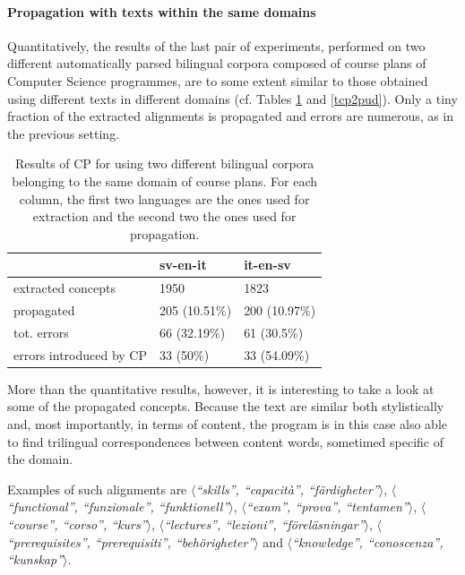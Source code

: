 \paragraph{Propagation with texts within the same domains}

Quantitatively, the results of the last pair of experiments, performed on two different automatically parsed bilingual corpora composed of course plans of Computer Science programmes, are to some extent similar to those obtained using different texts in different domains (cf. Tables \ref{tcp2courses} and \ref{tcp2pud}). Only a tiny fraction of the extracted alignments is propagated and errors are numerous, as in the previous setting. 

\begin{table}[H]
    \centering
    \begin{tabular}{|l|l|l|}
    \hline
                           & \textbf{sv-en-it} & \textbf{it-en-sv} \\ \hline
    extracted concepts     & 1950              & 1823              \\ \hline
    propagated             & 205 (10.51\%)     & 200 (10.97\%)     \\ \hline
    tot. errors            & 66 (32.19\%)      & 61 (30.5\%)       \\ \hline
    errors introduced by CP & 33 (50\%)        & 33 (54.09\%)      \\ \hline
    \end{tabular}
    \caption[Performance of CP Scenario 2 on automatically parsed homogeneous data]{Results of CP for using two different bilingual corpora belonging to the same domain of course plans. For each column, the first two languages are the ones used for extraction and the second two the ones used for propagation.}
    \label{tcp2courses}
    \end{table}

    More than the quantitative results, however, it is interesting to take a look at some of the propagated concepts. Because the text are similar both stylistically and, most importantly, in terms of content, the program is in this case also able to find trilingual correspondences between content words, sometimed specific of the domain. 
    
    Examples of such alignments are $\langle$\textit{``skills'', ``capacità'', ``färdigheter''}$\rangle$, $\langle$\textit{``functional'', ``funzionale'', ``funktionell''}$\rangle$, $\langle$\textit{``exam'', ``prova'', ``tentamen''}$\rangle$, $\langle$\textit{``course'', ``corso'', ``kurs''}$\rangle$, $\langle$\textit{``lectures'', ``lezioni'', ``föreläsningar''}$\rangle$, $\langle$\textit{``prerequisites'', ``prerequisiti'', ``behörigheter''}$\rangle$ and $\langle$\textit{``knowledge'', ``conoscenza'', ``kunskap''}$\rangle$. \smallskip

